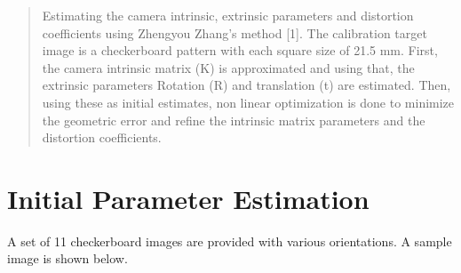 \documentclass[conference]{IEEEtran}
\begin{document}
\begin{abstract}
Estimating the camera intrinsic, extrinsic parameters and distortion coefficients using Zhengyou Zhang's method [1]. The calibration target image is a checkerboard pattern with each square size of 21.5 mm. First, the camera intrinsic matrix (K) is approximated and using that, the extrinsic parameters Rotation (R) and translation (t) are estimated. Then, using these as initial estimates, non linear optimization is done to minimize the geometric error and refine the intrinsic matrix parameters and the distortion coefficients.

 
\end{abstract}





%
\IEEEpeerreviewmaketitle



\section{Initial Parameter Estimation}
A set of 11 checkerboard images are provided with various orientations. A sample image is shown below.
\end{document}

